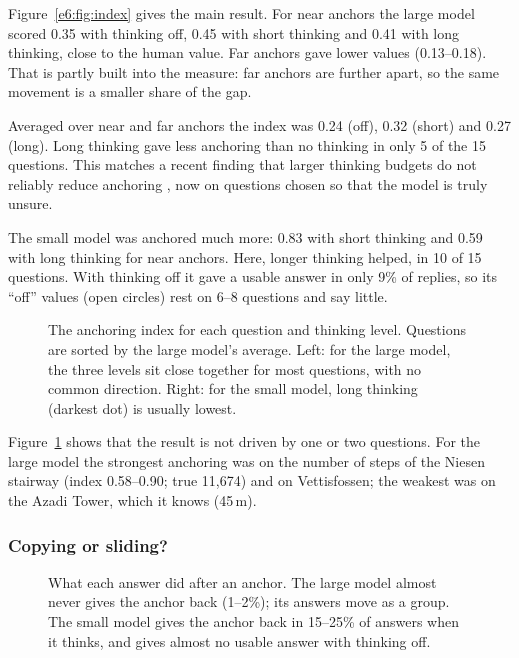 \documentclass[11pt,a4paper]{article}
\begin{document}
Figure~\ref{e6:fig:index} gives the main result. For near anchors the large model scored 0.35 with thinking off, 0.45 with short thinking and 0.41 with long thinking, close to the human value. Far anchors gave lower values (0.13--0.18). That is partly built into the measure: far anchors are further apart, so the same movement is a smaller share of the gap.

\begin{keybox}
Averaged over near and far anchors the index was 0.24 (off), 0.32 (short) and 0.27 (long). Long thinking gave less anchoring than no thinking in only 5 of the 15 questions. This matches a recent finding that larger thinking budgets do not reliably reduce anchoring \citep{kraishan2026long}, now on questions chosen so that the model is truly unsure.
\end{keybox}

The small model was anchored much more: 0.83 with short thinking and 0.59 with long thinking for near anchors. Here, longer thinking helped, in 10 of 15 questions. With thinking off it gave a usable answer in only 9\% of replies, so its \enquote{off} values (open circles) rest on 6--8 questions and say little.

\begin{figure}[ht]
\centering{}
\caption{The anchoring index for each question and thinking level. Questions are sorted by the large model's average. Left: for the large model, the three levels sit close together for most questions, with no common direction. Right: for the small model, long thinking (darkest dot) is usually lowest.}
\label{e6:fig:items}
\end{figure}

Figure~\ref{e6:fig:items} shows that the result is not driven by one or two questions. For the large model the strongest anchoring was on the number of steps of the Niesen stairway (index 0.58--0.90; true 11,674) and on Vettisfossen; the weakest was on the Azadi Tower, which it knows (45\,m).

\subsubsection{Copying or sliding?}

\begin{figure}[ht]
\centering{}
\caption{What each answer did after an anchor. The large model almost never gives the anchor back (1--2\%); its answers move as a group. The small model gives the anchor back in 15--25\% of answers when it thinks, and gives almost no usable answer with thinking off.}
\label{e6:fig:outcomes}
\end{figure}
\end{document}
